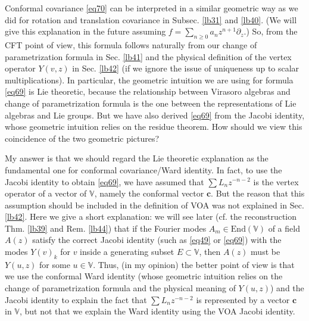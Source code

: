 \documentclass[12pt,a4paper,notitlepage]{article}
\theoremstyle{definition}
\theoremstyle{plain}
\newcommand{\End}{\mathrm{End}} %
\newcommand{\Vbb}{\mathbb V}
\newcommand{\cbf}{\mathbf c}
\numberwithin{equation}{section}
\begin{document}
Conformal covariance \eqref{eq70} can be interpreted in a similar geometric way as we did for rotation and translation covariance in Subsec. \ref{lb31} and \ref{lb40}. (We will give this explanation in the future assuming $f=\sum_{n\geq 0}a_nz^{n+1}\partial_z$.) So, from the CFT point of view, this formula follows naturally from our change of parametrization formula in Sec. \ref{lb41} and the physical definition of the vertex operator $Y(v,z)$ in Sec. \ref{lb42} (if we ignore the issue of uniqueness up to scalar multiplications). In particular, the geometric intuition we are using for formula \eqref{eq69} is Lie theoretic, because the relationship between Virasoro algebras and change of parametrization formula is the one between the representations of Lie algebras and Lie groups. But we have also derived \eqref{eq69} from the Jacobi identity, whose geometric intuition relies on the residue theorem. How should we view this coincidence of the two geometric pictures?



My answer is that we should regard the Lie theoretic explanation as the fundamental one for conformal covariance/Ward identity. In fact, to use the Jacobi identity to   obtain \eqref{eq69}, we have assumed that $\sum L_nz^{-n-2}$ is the vertex operator of a vector of $\Vbb$, namely the conformal vector $\cbf$. But the reason that this assumption should be included in the definition of VOA was not explained in Sec. \ref{lb42}. Here we give a short explanation: we will see later (cf. the reconstruction Thm. \ref{lb39} and Rem. \ref{lb44}) that if the Fourier modes $A_m\in\End(\Vbb)$ of a  field $A(z)$ satisfy the correct Jacobi identity (such as \eqref{eq49} or \eqref{eq69}) with the modes $Y(v)_k$ for $v$ inside a generating subset $E\subset\Vbb$, then $A(z)$ must be $Y(u,z)$ for some $u\in \Vbb$. Thus, (in my opinion) the better point of view is that we use the conformal Ward identity (whose geometric intuition relies on the change of parametrization formula and the physical meaning of $Y(u,z)$) and the Jacobi identity to explain the fact that $\sum L_nz^{-n-2}$ is represented by a vector $\cbf$ in $\Vbb$, but not that we explain the Ward identity using the VOA Jacobi identity.
\end{document}
